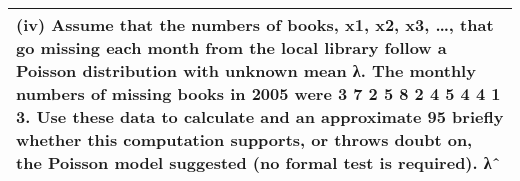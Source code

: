 \documentclass[a4paper,12pt]{article}
\begin{document}
\begin{table}[ht!]
     
\centering
     
\begin{tabular}{|p{15cm}|}
     
\hline        

\noindent

(iv) Assume that the numbers of books, x1, x2, x3, …, that go missing each month from the local library follow a Poisson 
distribution with unknown mean λ. The monthly numbers of missing books in 2005 were
3 7 2 5 8 2 4 5 4 4 1 3.
Use these data to calculate and an approximate 95%
briefly whether this computation supports, or throws doubt on, the Poisson model suggested (no formal test is required). λˆ

\\ \hline
      
\end{tabular}
    
\end{table}


\end{document}
